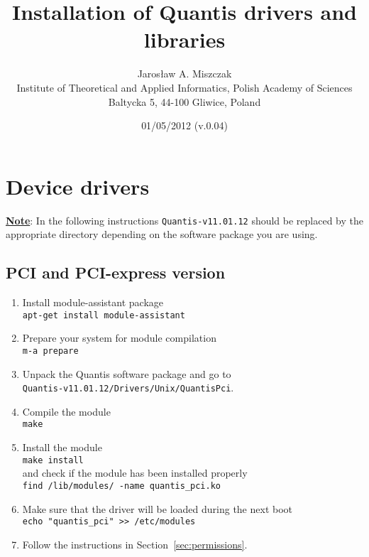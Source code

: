 \documentclass[a4paper,11pt]{article}
\title{Installation of Quantis drivers and libraries}
\author{Jaros{\l}aw A. Miszczak\\
Institute of Theoretical and Applied Informatics, Polish Academy of Sciences\\
Baltycka 5, 44-100 Gliwice, Poland}
\date{01/05/2012 (v.0.04)}
\begin{document}
\maketitle

\section{Device drivers}

\textbf{\underline{Note}}: In the following instructions
\texttt{Quantis-v11.01.12} should be replaced by the appropriate directory
depending on the software package you are using.
\subsection{PCI and PCI-express version}
\begin{enumerate}
    \item Install module-assistant package\\ \texttt{apt-get install
    module-assistant} 
    \item Prepare your system for module compilation\\ \texttt{m-a prepare}
    \item Unpack the Quantis software package and go to\\
    \texttt{Quantis-v11.01.12/Drivers/Unix/QuantisPci}.
    \item Compile the module\\ \texttt{make}
    \item Install the module\\ \texttt{make install}\\ and check if the module has been
    installed properly\\ \texttt{find /lib/modules/ -name quantis\_pci.ko}
    \item Make sure that the driver will be loaded during the next boot \\ \texttt{echo "quantis\_pci" >> /etc/modules}
    \item Follow the instructions in Section~\ref{sec:permissions}.
\end{enumerate}

\end{document}
